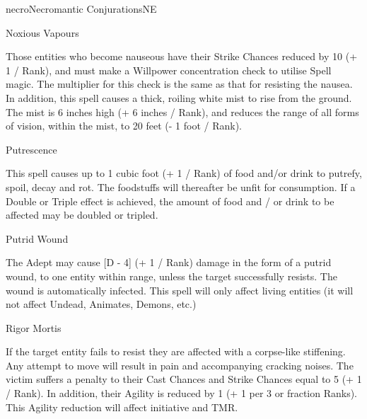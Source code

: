 \begin{college}[1.1]{necro}{Necromantic Conjurations}{NE}
\begin{spell}[G-6]{Noxious Vapours}
\begin{effects}
Those entities who become nauseous have their Strike Chances reduced
by 10 (+ 1 / Rank), and must make a Willpower concentration check to
utilise Spell magic.  The multiplier for this check is the same as
that for resisting the nausea.  In addition, this spell causes a
thick, roiling white mist to rise from the ground.  The mist is 6
inches high (+ 6 inches / Rank), and reduces the range of all forms of
vision, within the mist, to 20 feet (- 1 foot / Rank).
\end{effects}
\end{spell}

\begin{spell}[G-7]{Putrescence}

\begin{effects}
This spell causes up to 1 cubic foot (+ 1 / Rank) of food and/or drink
to putrefy, spoil, decay and rot.  The foodstuffs will thereafter be
unfit for consumption.  If a Double or Triple effect is achieved, the
amount of food and / or drink to be affected may be doubled or
tripled.
\end{effects}
\end{spell}

\begin{spell}[G-8]{Putrid Wound}

\begin{effects}
The Adept may cause [D - 4] (+ 1 / Rank) damage in the form of a
putrid wound, to one entity within range, unless the target
successfully resists.  The wound is automatically infected.  This
spell will only affect living entities (\ie it will not affect Undead,
Animates, Demons, etc.)
\end{effects}
\end{spell}

\begin{spell}[G-9]{Rigor Mortis}

\begin{effects}
If the target entity fails to resist they are affected with a
corpse-like stiffening.  Any attempt to move will result in pain and
accompanying cracking noises.  The victim suffers a penalty to their
Cast Chances and Strike Chances equal to 5 (+ 1 / Rank).  In addition,
their Agility is reduced by 1 (+ 1 per 3 or fraction Ranks).  This
Agility reduction will affect initiative and TMR.
\end{effects}
\end{spell}


\end{college}

